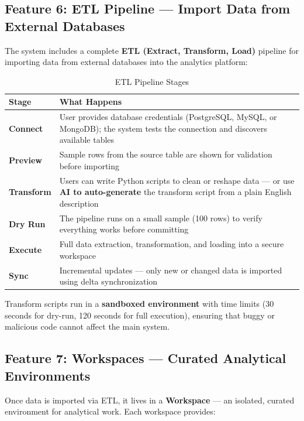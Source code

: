 \documentclass[12pt,a4paper]{report}
\begin{document}
\subsection{Feature 6: ETL Pipeline --- Import Data from External Databases}

The system includes a complete \textbf{ETL (Extract, Transform, Load)} pipeline for importing data from external databases into the analytics platform:

\begin{table}[H]
\centering
\caption{ETL Pipeline Stages}
\begin{tabular}{>{\bfseries}p{2.5cm} p{10cm}}
\toprule
\textbf{Stage} & \textbf{What Happens} \\
\midrule
Connect & User provides database credentials (PostgreSQL, MySQL, or MongoDB); the system tests the connection and discovers available tables \\
Preview & Sample rows from the source table are shown for validation before importing \\
Transform & Users can write Python scripts to clean or reshape data --- or use \textbf{AI to auto-generate} the transform script from a plain English description \\
Dry Run & The pipeline runs on a small sample (100 rows) to verify everything works before committing \\
Execute & Full data extraction, transformation, and loading into a secure workspace \\
Sync & Incremental updates --- only new or changed data is imported using delta synchronization \\
\bottomrule
\end{tabular}
\label{tab:etl_stages}
\end{table}

Transform scripts run in a \textbf{sandboxed environment} with time limits (30 seconds for dry-run, 120 seconds for full execution), ensuring that buggy or malicious code cannot affect the main system.

\subsection{Feature 7: Workspaces --- Curated Analytical Environments}

Once data is imported via ETL, it lives in a \textbf{Workspace} --- an isolated, curated environment for analytical work. Each workspace provides:
\end{document}
